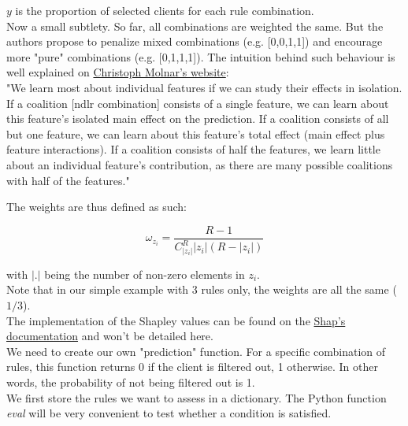 $y$ is the proportion of selected clients for each rule combination. \\

Now a small subtlety. So far, all combinations are weighted the same. But the authors propose to penalize mixed combinations (e.g. [0,0,1,1]) and encourage more "pure" combinations (e.g. [0,1,1,1]). The intuition behind such behaviour is well explained on \href{https://christophm.github.io/interpretable-ml-book/shapley.html}{Christoph Molnar’s website}: \\

"We learn most about individual features if we can study their effects in isolation. If a coalition [ndlr combination] consists of a single feature, we can learn about this feature’s isolated main effect on the prediction. If a coalition consists of all but one feature, we can learn about this feature’s total effect (main effect plus feature interactions). If a coalition consists of half the features, we learn little about an individual feature’s contribution, as there are many possible coalitions with half of the features."

The weights are thus defined as such:

$$\omega_{z_i} = \frac{R-1}{C_{|z_i|}^R |z_i|(R-|z_i|)}$$

with $|.|$ being the number of non-zero elements in $z_i$. \\

Note that in our simple example with 3 rules only, the weights are all the same ($1/3$). \\

The implementation of the Shapley values can be found on the \href{https://shap.readthedocs.io/en/latest/example_notebooks/tabular_examples/model_agnostic/Simple%20Kernel%20SHAP.html}{Shap's documentation} and won't be detailed here. \\

We need to create our own "prediction" function. For a specific combination of rules, this function returns $0$ if the client is filtered out, 1 otherwise. In other words, the probability of not being filtered out is 1. \\

We first store the rules we want to assess in a dictionary. The Python function \textit{eval} will be very convenient to test whether a condition is satisfied.

